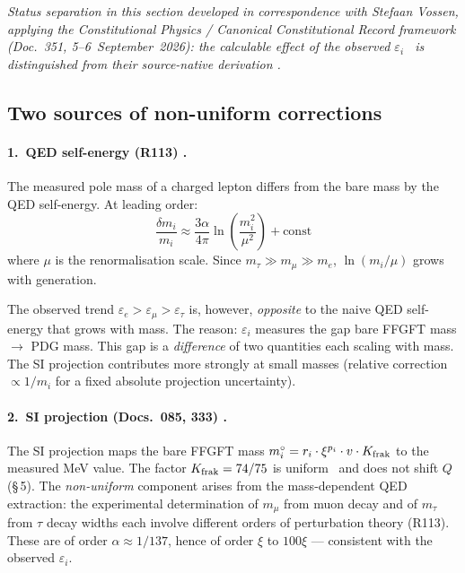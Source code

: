 \noindent\emph{Status separation in this section developed in correspondence with
Stefaan Vossen, applying the Constitutional Physics / Canonical Constitutional Record
framework (Doc.~351, 5--6~September~2026): the calculable effect of the observed
$\varepsilon_i$ \KM\ is distinguished from their source-native derivation \SM.}

\subsection*{Two sources of non-uniform corrections}

\paragraph{1.\ QED self-energy (R113) \QM.}
The measured pole mass of a charged lepton differs from the bare mass by the QED
self-energy. At leading order:
\begin{equation}
  \frac{\delta m_i}{m_i} \approx \frac{3\alpha}{4\pi}
  \ln\!\left(\frac{m_i^2}{\mu^2}\right) + \text{const}
\end{equation}
where $\mu$ is the renormalisation scale. Since $m_\tau \gg m_\mu \gg m_e$,
$\ln(m_i/\mu)$ grows with generation.

The observed trend $\varepsilon_e > \varepsilon_\mu > \varepsilon_\tau$ is,
however, \emph{opposite} to the naive QED self-energy that grows with mass.
The reason: $\varepsilon_i$ measures the gap bare FFGFT mass $\to$ PDG mass.
This gap is a \emph{difference} of two quantities each scaling with mass. The
SI projection contributes more strongly at small masses (relative correction
$\propto 1/m_i$ for a fixed absolute projection uncertainty).

\paragraph{2.\ SI projection (Docs.~085, 333) \SM.}
The SI projection maps the bare FFGFT mass $m^\circ_i = r_i\cdot\xi^{p_i}\cdot v\cdot K_{\rm frak}$
to the measured MeV value. The factor $K_{\rm frak} = 74/75$ is uniform \BM\ and
does not shift $Q$ (§\,5). The \emph{non-uniform} component arises from the
mass-dependent QED extraction: the experimental determination of $m_\mu$ from muon
decay and of $m_\tau$ from $\tau$ decay widths each involve different orders of
perturbation theory (R113). These are of order $\alpha\approx 1/137$, hence of
order $\xi$ to $100\xi$ --- consistent with the observed $\varepsilon_i$.

